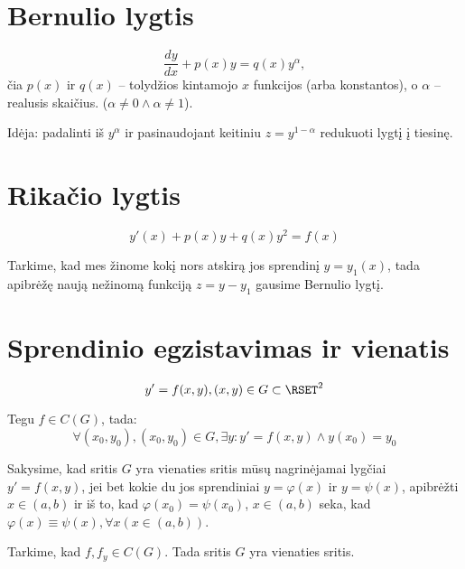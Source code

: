 \section{Bernulio lygtis}

\begin{equation}
  \frac{dy}{dx} + p(x) y = q(x) y^{\alpha},
  \label{eq:sk2:4}
\end{equation}
čia $p(x)$ ir $q(x)$ – tolydžios kintamojo $x$ funkcijos (arba konstantos),
o $\alpha$ – realusis skaičius. ($\alpha \neq 0 \land \alpha \neq 1$).

Idėja: padalinti iš $y^{\alpha}$ ir pasinaudojant keitiniu
$z = y^{1-\alpha}$ redukuoti lygtį į tiesinę.

\section{Rikačio lygtis}

\begin{equation}
  y'(x) + p(x)y + q(x)y^{2} = f(x)
  \label{eq:sk2:5}
\end{equation}

Tarkime, kad mes žinome kokį nors atskirą jos sprendinį $y = y_{1}(x)$,
tada apibrėžę naują nežinomą funkciją $z = y-y_{1}$ gausime
Bernulio lygtį.

\section{Sprendinio egzistavimas ir vienatis}

\begin{equation*}
  y' = f(x, y), (x, y) \in G \subset \RSET^{2}
\end{equation*}

\begin{prop}
  Tegu $f \in C(G)$, tada:
  \begin{equation*}
    \forall (x_{0}, y_{0}), (x_{0}, y_{0}) \in G, \exists y :%
    y' = f(x, y) \land y(x_{0}) = y_{0}
  \end{equation*}
\end{prop}

\begin{defn}
  Sakysime, kad sritis $G$ yra vienaties sritis mūsų nagrinėjamai lygčiai
  $y' = f(x, y)$, jei bet kokie du jos sprendiniai $y = \varphi(x)$ ir
  $y = \psi(x)$, apibrėžti $x \in (a, b)$ ir iš to, kad
  $\varphi(x_{0}) = \psi(x_{0})$, $x \in (a, b)$ seka, kad
  $\varphi(x) \equiv \psi(x), \forall x(x \in (a, b))$.
\end{defn}

\begin{prop}
  Tarkime, kad $f, f_{y} \in C(G)$. Tada sritis $G$ yra vienaties sritis.
\end{prop}
